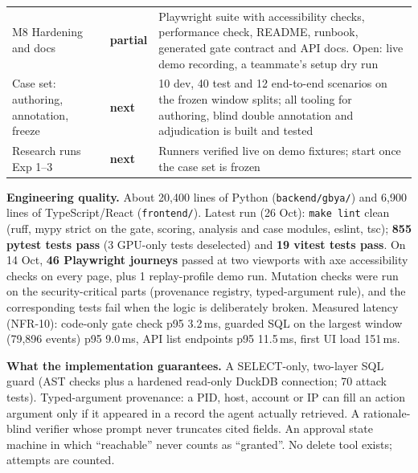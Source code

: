 \documentclass[11pt,a4paper]{article}
\newcommand{\code}[1]{\texttt{\small #1}}
\newcommand{\partdone}{\textcolor{orange!80!black}{\textbf{partial}}}
\newcommand{\notdone}{\textcolor{blue!60!black}{\textbf{next}}}
\begin{document}
{\begin{tabularx}{\linewidth}{@{}p{3.3cm}p{1.6cm}L@{}}
M8 Hardening and docs & \partdone & Playwright suite with accessibility checks, performance check, README, runbook, generated gate contract and API docs. Open: live demo recording, a teammate's setup dry run \\
Case set: authoring, annotation, freeze & \notdone & 10 dev, 40 test and 12 end-to-end scenarios on the frozen window splits; all tooling for authoring, blind double annotation and adjudication is built and tested \\
Research runs Exp 1--3 & \notdone & Runners verified live on demo fixtures; start once the case set is frozen \\
\bottomrule
\end{tabularx}}

\textbf{Engineering quality.} About 20,400 lines of Python (\code{backend/gbya/}) and 6,900 lines of TypeScript/React (\code{frontend/}). Latest run (26 Oct): \code{make lint} clean (ruff, mypy strict on the gate, scoring, analysis and case modules, eslint, tsc); \textbf{855 pytest tests pass} (3 GPU-only tests deselected) and \textbf{19 vitest tests pass}. On 14 Oct, \textbf{46 Playwright journeys} passed at two viewports with axe accessibility checks on every page, plus 1 replay-profile demo run. Mutation checks were run on the security-critical parts (provenance registry, typed-argument rule), and the corresponding tests fail when the logic is deliberately broken. Measured latency (NFR-10): code-only gate check p95 3.2\,ms, guarded SQL on the largest window (79,896 events) p95 9.0\,ms, API list endpoints p95 11.5\,ms, first UI load 151\,ms.

\textbf{What the implementation guarantees.} A SELECT-only, two-layer SQL guard (AST checks plus a hardened read-only DuckDB connection; 70 attack tests). Typed-argument provenance: a PID, host, account or IP can fill an action argument only if it appeared in a record the agent actually retrieved. A rationale-blind verifier whose prompt never truncates cited fields. An approval state machine in which ``reachable'' never counts as ``granted''. No delete tool exists; attempts are counted.

\end{document}
